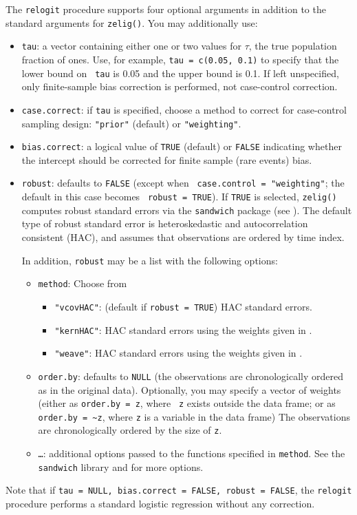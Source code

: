 The {\tt relogit} procedure supports four optional arguments in
addition to the standard arguments for {\tt zelig()}.  You may
additionally use:  
\begin{itemize}
\item {\tt tau}: a vector containing either one or two values for
  $\tau$, the true population fraction of ones.  Use, for example,
  {\tt tau = c(0.05, 0.1)} to specify that the lower bound on {\tt
  tau} is 0.05 and the upper bound is 0.1.  If left unspecified, only
finite-sample bias correction is performed, not case-control correction.
\item {\tt case.correct}: if {\tt tau} is specified, choose a method
to correct for case-control sampling design: {\tt "prior"} (default)
or {\tt "weighting"}.   
\item {\tt bias.correct}: a logical value of {\tt TRUE} (default) or
  {\tt FALSE} indicating whether the intercept should be corrected for
  finite sample (rare events) bias.
\item {\tt robust}:  defaults to {\tt FALSE} (except when {\tt
case.control = "weighting"}; the default in this case becomes {\tt
robust = TRUE}). If {\tt TRUE} is selected, {\tt zelig()} computes
robust standard errors via the {\tt sandwich} package (see
\cite{Zeileis04}).  The default type of robust standard error is
heteroskedastic and autocorrelation consistent (HAC), and assumes that
observations are ordered by time index.

In addition, {\tt robust} may be a list with the following options:  
\begin{itemize}
\item {\tt method}:  Choose from 
\begin{itemize}
\item {\tt "vcovHAC"}: (default if {\tt robust = TRUE}) HAC standard
errors. 
\item {\tt "kernHAC"}: HAC standard errors using the
weights given in \cite{Andrews91}. 
\item {\tt "weave"}: HAC standard errors using the
weights given in \cite{LumHea99}.  
\end{itemize}  
\item {\tt order.by}: defaults to {\tt NULL} (the observations are
chronologically ordered as in the original data).  Optionally, you may
specify a vector of weights (either as {\tt order.by = z}, where {\tt
z} exists outside the data frame; or as {\tt order.by = \~{}z}, where
{\tt z} is a variable in the data frame)  The observations are
chronologically ordered by the size of {\tt z}.
\item {\tt \dots}:  additional options passed to the functions 
specified in {\tt method}.   See the {\tt sandwich} library and
\cite{Zeileis04} for more options.   
\end{itemize}
\end{itemize}
Note that if {\tt tau = NULL, bias.correct = FALSE, robust = FALSE},
the {\tt relogit} procedure performs a standard logistic regression
without any correction.

